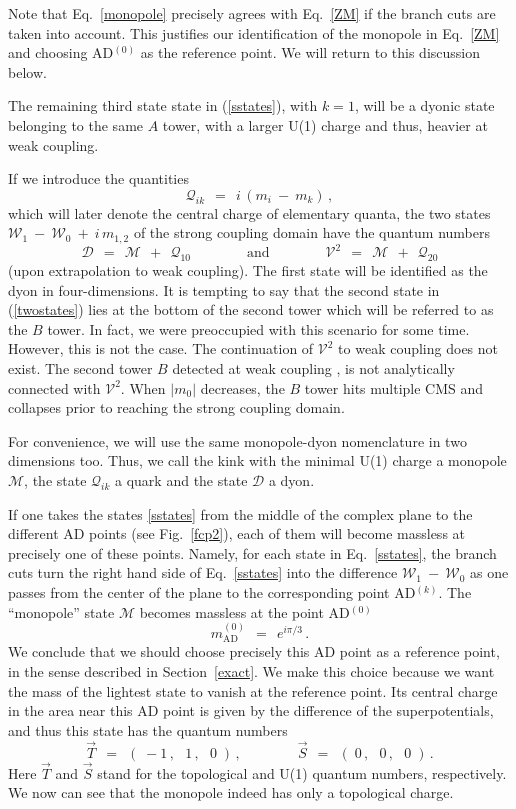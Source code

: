 \documentclass[epsfig,12pt]{article}
\def\beq{\begin{equation}}
\def\eeq{\end{equation}}
\def\beq{\begin{equation}}
\def\eeq{\end{equation}}
\newcommand{\W}{\mathcal{W}}
\newcommand{\M}{\mathcal{M}}
\newcommand{\Q}{\mathcal{Q}}
\newcommand{\D}{\mathcal{D}}
\newcommand{\V}{\mathcal{V}}
\begin{document}
	Note that Eq.~\eqref{monopole} precisely agrees with Eq.~\eqref{ZM} if the branch cuts are taken into account.
	This justifies our identification of the monopole in Eq.~\eqref{ZM} and choosing AD$^{(0)}$ as the reference point.
	We will return to this discussion below.
	
	The remaining third state state in (\ref{sstates}), with $k=1$, will be a dyonic state belonging to the same
	$A$ tower, with a larger U(1) charge and thus, heavier at weak coupling.

	If we introduce the quantities
\beq
\label{quark}
	\Q_{ik} ~~=~~ i\, \left( m_i  ~-~ m_k \right)\,,
\eeq
	which will later denote the central charge of elementary quanta, 
	the  two states 
	$ \W_1 ~-~ \W_0 ~+~ i\, m_{1,2} $
	of the strong coupling domain    have the quantum numbers 
\beq
\label{twostates}
	\D  ~~=~~  \M ~~+~~ \Q_{10}  \qquad\qquad  \text{and}  \qquad\qquad   
	\V^2  ~~=~~  \M ~~+~~ \Q_{20}
\eeq
(upon extrapolation to weak coupling).
	The first state will be identified as the dyon in four-dimensions. It is tempting to say that
	the second state in (\ref{twostates}) lies at the bottom of the second tower which will be referred to as the
	$B$ tower. In fact, we were preoccupied with this scenario for some time.
	However, this is not the case. The continuation of $\V^2$ to weak coupling 
	does not exist. The second tower $B$ detected at weak coupling \cite{Bolokhov:2011mp},
	is not analytically connected with $\V^2$.
	 When $|m_0|$ decreases, the $B$ tower hits multiple CMS and collapses
	prior to reaching the strong coupling domain.
	
	For convenience, we will use the same monopole-dyon nomenclature  in two dimensions too.
	 Thus, we call the kink with the minimal U(1) charge a monopole $ \M $, 
	the state $ \Q_{ik} $ a quark and the state $ \D $ a dyon.

	If one takes the states \eqref{sstates} from the middle of the complex plane to the different AD points 
	(see Fig.~\ref{fcp2}), each of them will become massless at precisely one of these points.
	Namely, for each state in Eq.~\eqref{sstates}, 
	the branch cuts turn the right hand side of Eq.~\eqref{sstates} into 
	the difference $ \W_1 ~-~ \W_0 $ as one passes from the center of the plane to the corresponding point AD$^{(k)}$.
	The ``monopole'' state $ \M $ becomes massless at the point AD$^{(0)}$
\beq
	m_\text{AD}^{(0)} ~~=~~ e^{i \pi / 3}\,.
\eeq
	We conclude that we should choose precisely this AD point as a reference point, 
	in the sense described in Section~\ref{exact}.
	We make this choice because we want the mass of the lightest state to vanish at the reference point. 
	Its central charge in the area near this AD point is given by the difference of the superpotentials,
	and thus this state has the quantum numbers
\beq
\label{Mtop}
	\vec{T} ~~=~~  (\; -1\,, ~~~ 1\,, ~~~ 0 \;)\,,	\qquad\qquad
	\vec{S} ~~=~~  (\;  0\,, ~~~ 0\,, ~~~ 0 \;)\,.
\eeq
	Here $ \vec{T} $ and $ \vec{S} $ stand for the topological and U(1) quantum numbers, respectively.
	We now can see that the monopole indeed has only a topological charge. 
\end{document}
